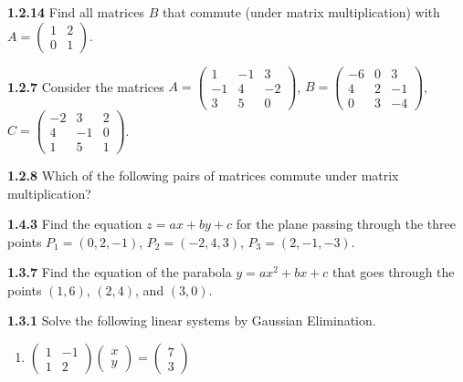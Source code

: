 \documentclass{article}
\begin{document}
\textbf{1.2.14} Find all matrices \(B\) that commute (under matrix multiplication) with \(A = \begin{pmatrix} 1 & 2 \\ 0 & 1 \end{pmatrix}\).
\vspace{10pt}

\textbf{1.2.7} Consider the matrices \(A = \begin{pmatrix} 1 & -1 & 3 \\ -1 & 4 & -2 \\ 3 & 5 & 0 \end{pmatrix}\), \(B = \begin{pmatrix} -6 & 0 & 3 \\ 4 & 2 & -1 \\ 0 & 3 & -4 \end{pmatrix}\), \(C = \begin{pmatrix} -2 & 3 & 2 \\ 4 & -1 & 0 \\ 1 & 5 & 1 \end{pmatrix}\).
\vspace{10pt}

\textbf{1.2.8} Which of the following pairs of matrices commute under matrix multiplication?
\vspace{10pt}

\textbf{1.4.3} Find the equation \(z = ax + by + c\) for the plane passing through the three points \(P_1 = (0, 2, -1)\), \(P_2 = (-2, 4, 3)\), \(P_3 = (2, -1, -3)\).
\vspace{10pt}

\textbf{1.3.7} Find the equation of the parabola \(y = ax^2 + bx + c\) that goes through the points \((1, 6)\), \((2, 4)\), and \((3, 0)\).
\vspace{10pt}

\textbf{1.3.1} Solve the following linear systems by Gaussian Elimination.
\begin{enumerate}
    \item \(\begin{pmatrix} 1 & -1 \\ 1 & 2 \end{pmatrix} \begin{pmatrix} x \\ y \end{pmatrix} = \begin{pmatrix} 7 \\ 3 \end{pmatrix}\)
\end{enumerate}
\vspace{10pt}
\end{document}
